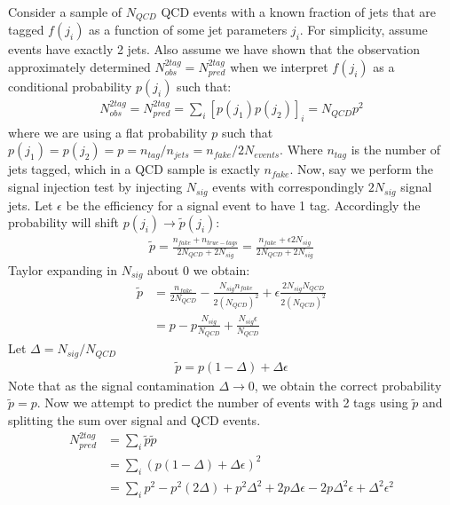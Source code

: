 Consider a sample of $N_{QCD}$ QCD events with a known fraction of jets that are tagged $f(j_i)$ as a function of some jet parameters $j_i$. 
For simplicity, assume events have exactly 2 jets. Also assume 
we have shown that the observation approximately determined $N_{obs}^{2tag} = N_{pred}^{2tag}$ when we interpret $f(j_i)$ as a conditional probability 
$p(j_i)$ such that:
\begin{align*}
N_{obs}^{2tag} = N_{pred}^{2tag} = \sum_i [p(j_1)p(j_2)]_{i}  = N_{QCD}p^2 
\end{align*}
where we are using a flat probability $p$ such that  $p(j_1)=p(j_2)=p=n_{tag}/n_{jets} =  n_{fake} / 2N_{events}$. Where $n_{tag}$ is the number of jets tagged, which 
in a QCD sample is exactly $n_{fake}$. Now, say we perform the signal injection test by
injecting $N_{sig}$ events with correspondingly $2N_{sig}$ signal jets. Let $\epsilon$ be the efficiency for a signal event to have 1 tag. 
 Accordingly the probability will shift $p(j_i)\rightarrow \tilde{p}(j_i)$:
\begin{align*}
\tilde{p} = \frac{n_{fake} + n_{true-tags}}{2N_{QCD} + 2N_{sig}} = \frac{n_{fake} + \epsilon 2N_{sig} }{2N_{QCD} + 2N_{sig}}
\end{align*}
Taylor expanding in $N_{sig}$ about 0 we obtain:
\begin{align*}
\tilde{p} &= \frac{n_{fake}}{2N_{QCD}} - \frac{N_{sig}n_{fake}}{2(N_{QCD})^2} + \epsilon\frac{2N_{sig} N_{QCD}}{2(N_{QCD})^2}\\
&= p - p\frac{N_{sig}}{N_{QCD}} + \frac{N_{sig}\epsilon}{N_{QCD}}
\end{align*}
Let $\Delta = N_{sig}/{N_{QCD}}$
\begin{align*}
\tilde{p} = p(1-\Delta) + \Delta\epsilon
\end{align*}
Note that as the signal contamination  $\Delta\rightarrow 0$, we obtain the correct probability $\tilde{p}=p$. 
Now we attempt to predict the number of events with 2 tags using $\tilde{p}$ and splitting the sum over signal and QCD events.
\begin{align*}
N_{pred}^{2tag} &= \sum_i \tilde{p}\tilde{p}\\ 
&= \sum_i (p(1-\Delta) + \Delta\epsilon)^2\\ 
&= \sum_i p^2 - p^2(2\Delta) + p^2\Delta^2 + 2p\Delta \epsilon - 2 p \Delta^2 \epsilon + \Delta^2 \epsilon^2\\
\end{align*}

